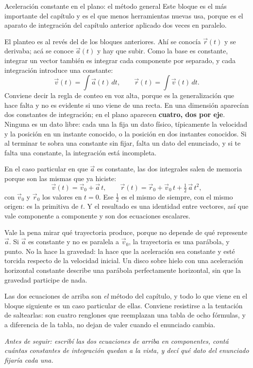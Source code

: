 \documentclass[11pt,openany]{book}
\begin{document}
\begin{bloque}{Aceleración constante en el plano: el método general}
Este bloque es el más importante del capítulo y es el que menos herramientas nuevas usa, porque es el aparato de integración del capítulo anterior aplicado dos veces en paralelo.

El planteo es al revés del de los bloques anteriores. Ahí se conocía $\vec r(t)$ y se derivaba; acá se conoce $\vec a(t)$ y hay que subir. Como la base es constante, integrar un vector también es integrar cada componente por separado, y cada integración introduce una constante:
\[
\vec v(t) = \int \vec a(t)\,dt, \qquad \vec r(t) = \int \vec v(t)\,dt.
\]
Conviene decir la regla de conteo en voz alta, porque es la generalización que hace falta y no es evidente si uno viene de una recta. En una dimensión aparecían dos constantes de integración; en el plano aparecen \textbf{cuatro, dos por eje}. Ninguna es un dato libre: cada una la fija un dato físico, típicamente la velocidad y la posición en un instante conocido, o la posición en dos instantes conocidos. Si al terminar te sobra una constante sin fijar, falta un dato del enunciado, y si te falta una constante, la integración está incompleta.

En el caso particular en que $\vec a$ es constante, las dos integrales salen de memoria porque son las mismas que ya hiciste:
\[
\vec v(t) = \vec v_0 + \vec a\,t, \qquad \vec r(t) = \vec r_0 + \vec v_0\,t + \tfrac12\,\vec a\,t^2,
\]
con $\vec v_0$ y $\vec r_0$ los valores en $t = 0$. Ese $\tfrac12$ es el mismo de siempre, con el mismo origen: es la primitiva de $t$. Y el resultado es una identidad entre vectores, así que vale componente a componente y son dos ecuaciones escalares.

Vale la pena mirar qué trayectoria produce, porque no depende de qué represente $\vec a$. Si $\vec a$ es constante y no es paralela a $\vec v_0$, la trayectoria es una parábola, y punto. No la hace la gravedad: la hace que la aceleración sea constante y esté torcida respecto de la velocidad inicial. Un disco sobre hielo con una aceleración horizontal constante describe una parábola perfectamente horizontal, sin que la gravedad participe de nada.

Las dos ecuaciones de arriba son \emph{el} método del capítulo, y todo lo que viene en el bloque siguiente es un caso particular de ellas. Conviene resistirse a la tentación de saltearlas: son cuatro renglones que reemplazan una tabla de ocho fórmulas, y a diferencia de la tabla, no dejan de valer cuando el enunciado cambia.

\textit{Antes de seguir: escribí las dos ecuaciones de arriba en componentes, contá cuántas constantes de integración quedan a la vista, y decí qué dato del enunciado fijaría cada una.}
\end{bloque}
\end{document}
